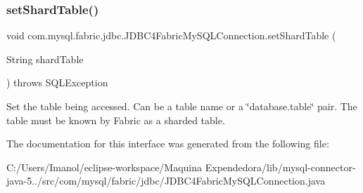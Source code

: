 \subsubsection{\texorpdfstring{set\+Shard\+Table()}{setShardTable()}}
{\footnotesize\ttfamily void com.\+mysql.\+fabric.\+jdbc.\+J\+D\+B\+C4\+Fabric\+My\+S\+Q\+L\+Connection.\+set\+Shard\+Table (\begin{DoxyParamCaption}\item[{String}]{shard\+Table }\end{DoxyParamCaption}) throws S\+Q\+L\+Exception}

Set the table being accessed. Can be a table name or a \char`\"{}database.\+table\char`\"{} pair. The table must be known by Fabric as a sharded table. 

The documentation for this interface was generated from the following file\+:\begin{DoxyCompactItemize}
\item 
C\+:/\+Users/\+Imanol/eclipse-\/workspace/\+Maquina Expendedora/lib/mysql-\/connector-\/java-\/5../src/com/mysql/fabric/jdbc/J\+D\+B\+C4\+Fabric\+My\+S\+Q\+L\+Connection.\+java\end{DoxyCompactItemize}
